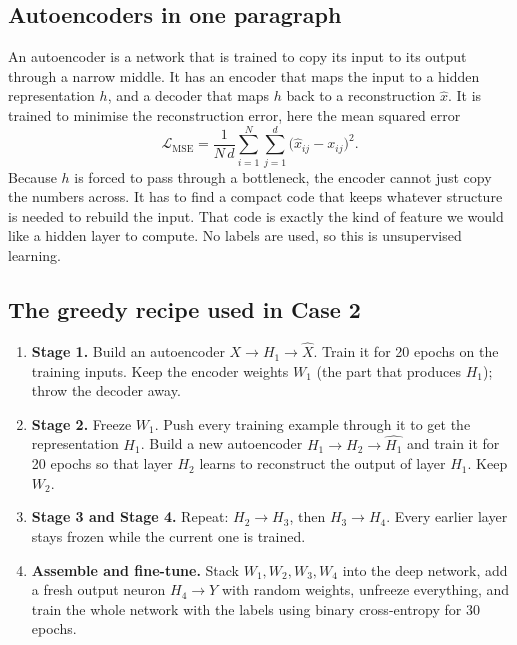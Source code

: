 \documentclass[12pt]{article}
\begin{document}
\subsection{Autoencoders in one paragraph}

An autoencoder is a network that is trained to copy its input to its output
through a narrow middle. It has an encoder that maps the input to a hidden
representation $h$, and a decoder that maps $h$ back to a reconstruction
$\hat{x}$. It is trained to minimise the reconstruction error, here the mean
squared error
\[
  \mathcal{L}_{\text{MSE}} = \frac{1}{N\,d}\sum_{i=1}^{N}\sum_{j=1}^{d}
  \bigl(\hat{x}_{ij} - x_{ij}\bigr)^2 .
\]
Because $h$ is forced to pass through a bottleneck, the encoder cannot just copy
the numbers across. It has to find a compact code that keeps whatever structure
is needed to rebuild the input. That code is exactly the kind of feature we
would like a hidden layer to compute. No labels are used, so this is
unsupervised learning.

\subsection{The greedy recipe used in Case 2}

\begin{enumerate}
\item \textbf{Stage 1.} Build an autoencoder
      $X \rightarrow H_1 \rightarrow \hat{X}$. Train it for 20 epochs on the
      training inputs. Keep the encoder weights $W_1$ (the part that produces
      $H_1$); throw the decoder away.
\item \textbf{Stage 2.} Freeze $W_1$. Push every training example through it to
      get the representation $H_1$. Build a new autoencoder
      $H_1 \rightarrow H_2 \rightarrow \hat{H_1}$ and train it for 20 epochs so
      that layer $H_2$ learns to reconstruct the output of layer $H_1$. Keep
      $W_2$.
\item \textbf{Stage 3 and Stage 4.} Repeat: $H_2 \rightarrow H_3$, then
      $H_3 \rightarrow H_4$. Every earlier layer stays frozen while the current
      one is trained.
\item \textbf{Assemble and fine-tune.} Stack $W_1, W_2, W_3, W_4$ into the deep
      network, add a fresh output neuron $H_4 \rightarrow Y$ with random
      weights, unfreeze everything, and train the whole network with the labels
      using binary cross-entropy for 30 epochs.
\end{enumerate}
\end{document}

